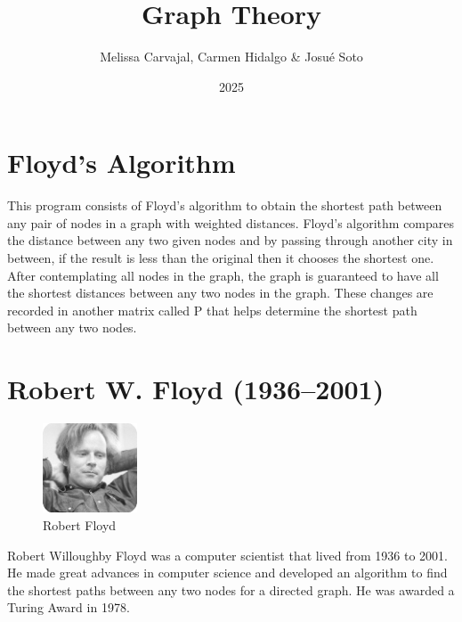 \documentclass{article}
\begin{document}
\title{Graph Theory}
\author{Melissa Carvajal, Carmen Hidalgo \& Josu\'e Soto}
\date{2025}


\maketitle

\newpage


\section{Floyd's Algorithm}
This program consists of Floyd's algorithm to obtain the shortest path between any pair of nodes in a graph with weighted distances.
Floyd's algorithm compares the distance between any two given nodes and by passing through another city in between, if the result is less than the original then it chooses the shortest one. After contemplating all nodes in the graph, the graph is guaranteed to have all the shortest distances between any two nodes in the graph. These changes are recorded in another matrix called P that helps determine the shortest path between any two nodes.
\section{Robert W. Floyd (1936–2001)}
\begin{figure}
\begin{center}
\includegraphics[width=0.25\textwidth]{floyd.jpg}
\caption{\label{fig:floyd}Robert Floyd}
\end{center}
\end{figure}

Robert Willoughby Floyd was a computer scientist that lived from 1936 to 2001. He made great advances in computer science and developed an algorithm to find the shortest paths between any two nodes for a directed graph. He was awarded a Turing Award in 1978.
\end{document}
